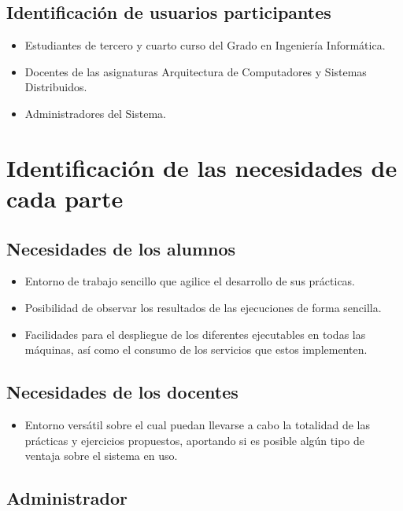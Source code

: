 \subsection{Identificación de usuarios participantes}

\begin{itemize}

  \item Estudiantes de tercero y cuarto curso del Grado en Ingeniería Informática.
  \item Docentes de las asignaturas Arquitectura de Computadores y Sistemas Distribuidos.
  \item Administradores del Sistema.
\end{itemize}

\section{Identificación de las necesidades de cada parte}
\subsection{Necesidades de los alumnos}

\begin{itemize}
  \item Entorno de trabajo sencillo que agilice el desarrollo de sus prácticas.
  \item Posibilidad de observar los resultados de las ejecuciones de forma sencilla.
  \item Facilidades para el despliegue de los diferentes ejecutables en todas las máquinas, así como el consumo de los servicios que estos implementen.
\end{itemize}

\subsection{Necesidades de los docentes}

\begin{itemize}
  \item Entorno versátil sobre el cual puedan llevarse a cabo la totalidad de las prácticas y ejercicios propuestos, aportando si es posible algún tipo de ventaja sobre el sistema en uso.
\end{itemize}

\subsection{Administrador}

